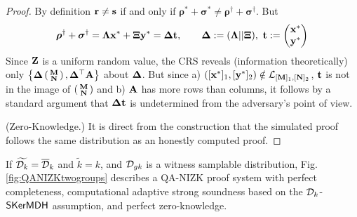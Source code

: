 \begin{proof}
By definition $\mathbf{r} \neq \mathbf{s}$  if and only if  $\boldsymbol \rho^{*}+\boldsymbol \sigma^{*} \neq 
\boldsymbol \rho^{\dagger}+ \boldsymbol \sigma^{\dagger}$.
But 
\begin{equation}
\boldsymbol \rho^{\dagger}+ \boldsymbol \sigma^{\dagger}=\mathbf{{\Lambda}}  \mathbf{x}^*+ \mathbf{{\Xi}} \mathbf{y}^*=
\mathbf{{\Delta}} \mathbf{t}, \qquad \mathbf{{\Delta}}:=(\mathbf{{\Lambda}}||\mathbf{{\Xi}}), \ \mathbf{t}:=\begin{pmatrix} \mathbf{x}^* \\ \mathbf{y}^* \end{pmatrix}
\end{equation}
Since $\mathbf{{Z}}$ is a uniform random value, the CRS reveals (information theoretically) only $\left\{\mathbf{{\Delta}}\left(\begin{smallmatrix}\mathbf{{M}}\\\mathbf{{N}}\end{smallmatrix}\right),  \mathbf{{\Delta}}^{\top}\mathbf{{A}} \right\}$ about $\mathbf{{\Delta}}$.
But since a) $([\mathbf{x}^*]_1,[\mathbf{y}^*]_2) \notin \mathcal{L}_{[\mathbf{{M}}]_1,[\mathbf{{N}}]_2}$, 
$\mathbf{t}$ is not in the image of $\left(\begin{smallmatrix}\mathbf{{M}}\\\mathbf{{N}}\end{smallmatrix}\right)$ and b) $\mathbf{{A}}$ has more rows than columns, it follows by a standard argument that $\mathbf{{\Delta}}\mathbf{t}$ is undetermined from the adversary's point of view.

(Zero-Knowledge.) It is direct from the construction that the simulated proof follows the same distribution as an honestly computed proof.
\end{proof}


\begin{theorem} If $\widetilde{\mathcal{D}_{k}}=\overline{\mathcal{D}}_k$ and $\tilde{k}=k$,  and $\mathcal{D}_{gk}$ is a witness samplable distribution, Fig. \ref{fig:QANIZKtwogroups}
describes a QA-NIZK proof system with perfect completeness, computational adaptive strong soundness based on the  $\mathcal{D}_{k}$-$\mathsf{SKerMDH}$ assumption, and perfect zero-knowledge. 
\label{theo:membtwogroups2}
\end{theorem}

